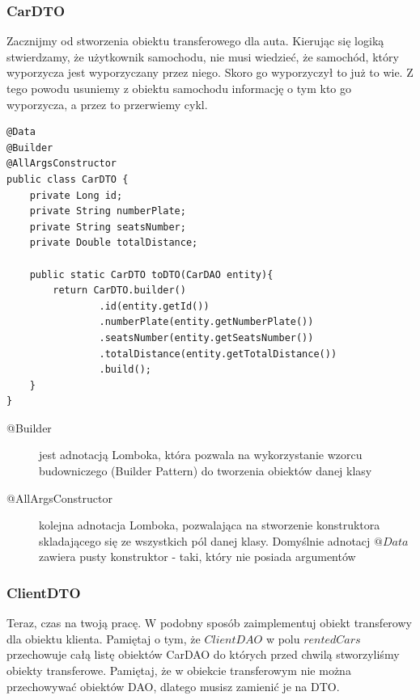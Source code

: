 \documentclass{article}
\begin{document}
            \subsubsection{CarDTO}
                Zacznijmy od stworzenia obiektu transferowego dla auta. Kierując się logiką stwierdzamy, że użytkownik samochodu, nie musi wiedzieć, że samochód, który wyporzycza jest wyporzyczany przez niego. Skoro go wyporzyczył to już to wie. Z tego powodu usuniemy z obiektu samochodu informację o tym kto go wyporzycza, a przez to przerwiemy cykl.
                \begin{verbatim}
@Data
@Builder
@AllArgsConstructor
public class CarDTO {
    private Long id;
    private String numberPlate;
    private String seatsNumber;
    private Double totalDistance;

    public static CarDTO toDTO(CarDAO entity){
        return CarDTO.builder()
                .id(entity.getId())
                .numberPlate(entity.getNumberPlate())
                .seatsNumber(entity.getSeatsNumber())
                .totalDistance(entity.getTotalDistance())
                .build();
    }
}
                \end{verbatim}
                \begin{description}
                    \item[@Builder] jest adnotacją Lomboka, która pozwala na wykorzystanie wzorcu budowniczego (Builder Pattern) do tworzenia obiektów danej klasy
                    \item[@AllArgsConstructor] kolejna adnotacja Lomboka, pozwalająca na stworzenie konstruktora skladającego się ze wszystkich pól danej klasy. Domyślnie adnotacj $@Data$ zawiera pusty konstruktor - taki, który nie posiada argumentów
                \end{description}
            \subsubsection{ClientDTO}
                Teraz, czas na twoją pracę. W podobny sposób zaimplementuj obiekt transferowy dla obiektu klienta. Pamiętaj o tym, że  $ClientDAO$ w polu $rentedCars$ przechowuje całą listę obiektów CarDAO do których przed chwilą stworzyliśmy obiekty transferowe. Pamiętaj, że w obiekcie transferowym nie można przechowywać obiektów DAO, dlatego musisz zamienić je na DTO.
                
\end{document}

